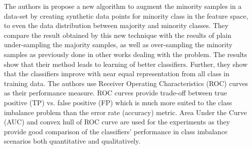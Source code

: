 \documentclass[10pt,journal,compsoc]{IEEEtran}
\begin{document}
The authors in \cite{smote} propose a new algorithm to augment the minority samples in a data-set by creating synthetic data points for minority class in the feature space, to even the data distribution between majority and minority classes. They compare the result obtained by this new technique with the results of plain under-sampling the majority samples, as well as over-sampling the minority samples as previously done in other works dealing with the problem.  The results show that their method leads to learning of better classifiers. Further, they show that the classifiers improve with near equal representation from all class in training data. The authors use Receiver Operating Characteristics (ROC) curves as their performance measure. ROC curves provide trade-off between true positive (TP) vs. false positive (FP) which is much more suited to the class imbalance problem than the error rate (accuracy) metric. Area Under the Curve (AUC) and convex hull of ROC curve are used for the experiments as they provide good comparison of the classifiers' performance in class imbalance scenarios both quantitative and qualitatively. 

\end{document}

